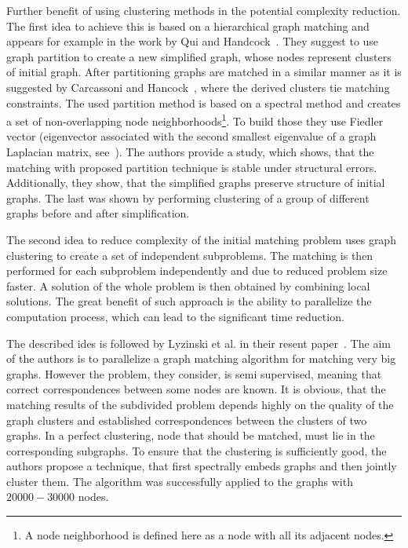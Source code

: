 Further benefit of using clustering methods in the potential complexity reduction. 
The first idea to achieve this is based on a hierarchical graph matching and appears for example in the work by Qui and Handcock~\cite{Hancock_GM_SpectralPart}. They suggest to use graph partition to create a new simplified graph, whose nodes represent clusters of initial graph. After partitioning graphs are matched in a similar manner as it is suggested by Carcassoni and Hancock~\cite{Hancock_ModalClusters}, where the derived clusters tie matching constraints. The used partition method is based on a spectral method and creates a set of non-overlapping node neighborhoods\footnote{A node neighborhood is defined here as a node with all its adjacent nodes.}. To build those they use Fiedler vector (eigenvector associated with the second smallest eigenvalue of a graph Laplacian matrix, see~\cite{Fiedler1975}). The authors provide a study, which shows, that the matching with proposed partition technique is stable under structural errors. Additionally, they show, that the simplified graphs preserve structure of initial graphs. The last was shown by performing clustering of a group of different graphs before and after simplification.

The second idea to reduce complexity of the initial matching problem uses graph clustering to create a set of independent subproblems. The matching is then performed for each subproblem independently and due to reduced problem size faster. A solution of the whole problem is then obtained by combining local solutions. The great benefit of such approach is the ability to parallelize the computation process, which can lead to the significant time reduction.

The described ides is followed by Lyzinski et al. in their resent paper~\cite{Lyzinski2015}. The aim of the authors is to parallelize a graph matching algorithm for matching very big graphs. However the problem, they consider, is semi supervised, meaning that correct correspondences between some nodes are known. It is obvious, that the matching results of the subdivided problem depends highly on the quality of the graph clusters and established correspondences between the clusters of two graphs. In a perfect clustering, node that should be matched, must lie in the corresponding subgraphs. To ensure that the clustering is sufficiently good, the authors propose a technique, that first spectrally embeds graphs and then jointly cluster them. The algorithm was successfully applied to the graphs with $20000-30000$ nodes.

